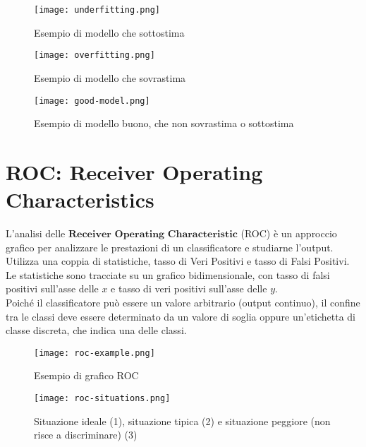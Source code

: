 			\begin{figure}[h]
				\caption{Esempio di modello che sottostima}
				\centering
				\texttt{[image: underfitting.png]}
			\end{figure}

			\begin{figure}[h]
				\caption{Esempio di modello che sovrastima}
				\centering
				\texttt{[image: overfitting.png]}
			\end{figure}


			\begin{figure}[h]
				\caption{Esempio di modello buono, che non sovrastima o sottostima}
				\centering
				\texttt{[image: good-model.png]}
			\end{figure}

	\clearpage

	\section{ROC: Receiver Operating Characteristics}
		L'analisi delle $\textbf{Receiver Operating Characteristic}$ (ROC) è un approccio grafico per analizzare le prestazioni di un classificatore e studiarne l'output.
		\\[1\baselineskip]
		Utilizza una coppia di statistiche, tasso di Veri Positivi e tasso di Falsi Positivi.
		Le statistiche sono tracciate su un grafico bidimensionale, con tasso di falsi positivi sull'asse delle $x$ e tasso di veri positivi sull'asse delle $y$.
		\\[1\baselineskip]
		Poiché il classificatore può essere un valore arbitrario (output continuo), il confine tra le classi deve essere determinato da un valore di soglia oppure un'etichetta di classe discreta, che indica una delle classi.
		
		\begin{figure}[h]
			\caption[short]{Esempio di grafico ROC}
			\centering
			\texttt{[image: roc-example.png]}
		\end{figure}

		\begin{figure}[h]
			\caption[short]{Situazione ideale (1), situazione tipica (2) e situazione peggiore (non risce a discriminare) (3)}
			\centering
			\texttt{[image: roc-situations.png]}
		\end{figure}

	\clearpage